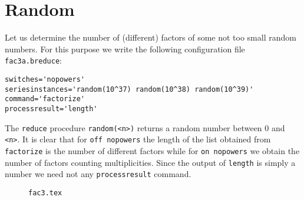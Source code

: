 \documentclass[a4paper]{article}
\begin{document}
\section{Random}
Let us determine the number of (different) factors of some not too
small random numbers. For this purpose we write the following
configuration file \texttt{fac3a.breduce}:
\begin{verbatim}
switches='nopowers'
seriesinstances='random(10^37) random(10^38) random(10^39)'
command='factorize'
processresult='length'
\end{verbatim}
The \texttt{reduce} procedure \texttt{random(<n>)} returns a random
number between $0$ and \texttt{<n>}. It is clear that for \texttt{off
  nopowers} the length of the list obtained from \texttt{factorize} is
the number of different factors while for \texttt{on nopowers} we
obtain the number of factors counting multiplicities. Since the output
of \texttt{length} is simply a number we need not any
\texttt{processresult} command.
\begin{figure}[p]
  \begin{center}
    \caption{\texttt{fac3.tex}\label{FI:fac3}}
  \end{center}
\end{figure}
\end{document}
